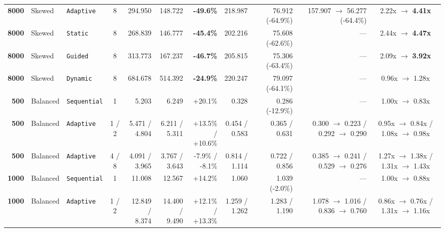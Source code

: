 \documentclass[11pt,a4paper]{article}
\renewcommand{\_}{\textunderscore\allowbreak}
\begin{document}
\begin{table}[H]
{\begin{tabular}{r l l c r r r r r r c}
\textbf{8000} & Skewed & \texttt{Adaptive} & 8 & 294.950 & 148.722 & \textbf{-49.6\%} & 218.987 & \makecell[r]{76.912\\ (-64.9\%)} & \makecell[r]{157.907 $\to$ 56.277\\ (-64.4\%)} & 2.22x $\to$ \textbf{4.41x} \\
\textbf{8000} & Skewed & \texttt{Static} & 8 & 268.839 & 146.777 & \textbf{-45.4\%} & 202.216 & 75.608 (-62.6\%) & --- & 2.44x $\to$ \textbf{4.47x} \\
\textbf{8000} & Skewed & \texttt{Guided} & 8 & 313.773 & 167.237 & \textbf{-46.7\%} & 205.815 & 75.306 (-63.4\%) & --- & 2.09x $\to$ \textbf{3.92x} \\
\textbf{8000} & Skewed & \texttt{Dynamic} & 8 & 684.678 & 514.392 & \textbf{-24.9\%} & 220.247 & 79.097 (-64.1\%) & --- & 0.96x $\to$ 1.28x \\
\textbf{500} & Balanced & \texttt{Sequential} & 1 & 5.203 & 6.249 & +20.1\% & 0.328 & 0.286 (-12.9\%) & --- & 1.00x $\to$ 0.83x \\
\textbf{500} & Balanced & \texttt{Adaptive} & 1 / 2 & \makecell[r]{5.471 /\\ 4.804} & \makecell[r]{6.211 /\\ 5.311} & \makecell[r]{+13.5\% /\\ +10.6\%} & \makecell[r]{0.454 /\\ 0.583} & \makecell[r]{0.365 /\\ 0.631} & \makecell[r]{0.300 $\to$ 0.223 /\\ 0.292 $\to$ 0.290} & \makecell[c]{0.95x $\to$ 0.84x /\\ 1.08x $\to$ 0.98x} \\
\textbf{500} & Balanced & \texttt{Adaptive} & 4 / 8 & \makecell[r]{4.091 /\\ 3.965} & \makecell[r]{3.767 /\\ 3.643} & \makecell[r]{-7.9\% /\\ -8.1\%} & \makecell[r]{0.814 /\\ 1.114} & \makecell[r]{0.722 /\\ 0.856} & \makecell[r]{0.385 $\to$ 0.241 /\\ 0.529 $\to$ 0.276} & \makecell[c]{1.27x $\to$ 1.38x /\\ 1.31x $\to$ 1.43x} \\
\textbf{1000} & Balanced & \texttt{Sequential} & 1 & 11.008 & 12.567 & +14.2\% & 1.060 & 1.039 (-2.0\%) & --- & 1.00x $\to$ 0.88x \\
\textbf{1000} & Balanced & \texttt{Adaptive} & 1 / 2 & \makecell[r]{12.849 /\\ 8.374} & \makecell[r]{14.400 /\\ 9.490} & \makecell[r]{+12.1\% /\\ +13.3\%} & \makecell[r]{1.259 /\\ 1.262} & \makecell[r]{1.283 /\\ 1.190} & \makecell[r]{1.078 $\to$ 1.016 /\\ 0.836 $\to$ 0.760} & \makecell[c]{0.86x $\to$ 0.76x /\\ 1.31x $\to$ 1.16x} \\

\end{tabular}}
\end{table}
\end{document}
